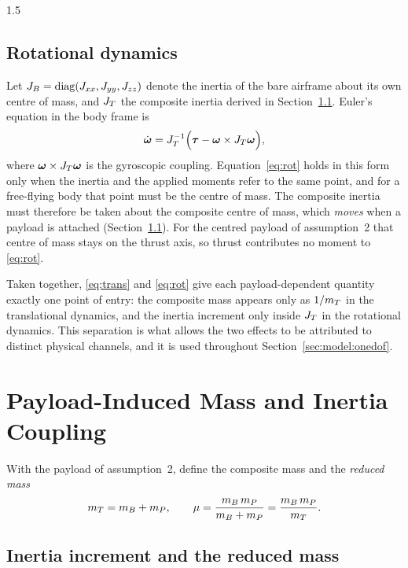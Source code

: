 \begin{spacing}{1.5}
\subsection{Rotational dynamics}\label{sec:model:rot}

Let $J_B = \mathrm{diag}(J_{xx}, J_{yy}, J_{zz})$ denote the inertia of the bare
airframe about its own centre of mass, and $J_T$ the composite inertia derived in
Section~\ref{sec:model:paxis}. Euler's equation in the body frame is
\begin{equation}
\dot{\bm{\omega}} = J_T^{-1}\Bigl( \bm{\tau} - \bm{\omega} \times J_T \bm{\omega} \Bigr),
\label{eq:rot}
\end{equation}
where $\bm{\omega} \times J_T \bm{\omega}$ is the gyroscopic coupling.
Equation~\eqref{eq:rot} holds in this form only when the inertia and the applied
moments refer to the same point, and for a free-flying body that point must be
the centre of mass. The composite inertia must therefore be taken about the
composite centre of mass, which \emph{moves} when a payload is attached
(Section~\ref{sec:model:paxis}). For the centred payload of assumption~2 that
centre of mass stays on the thrust axis, so thrust contributes no moment to
\eqref{eq:rot}.

Taken together, \eqref{eq:trans} and \eqref{eq:rot} give each payload-dependent
quantity exactly one point of entry: the composite mass appears only as $1/m_T$
in the translational dynamics, and the inertia increment only inside $J_T$ in
the rotational dynamics. This separation is what allows the two effects to be
attributed to distinct physical channels, and it is used throughout
Section~\ref{sec:model:onedof}.

\section{Payload-Induced Mass and Inertia Coupling}\label{sec:model:payload}

With the payload of assumption~2, define the composite mass and the
\emph{reduced mass}
\begin{equation}
m_T = m_B + m_P,
\qquad
\mu = \frac{m_B\, m_P}{m_B + m_P} = \frac{m_B\, m_P}{m_T}.
\label{eq:mu}
\end{equation}

\subsection{Inertia increment and the reduced mass}\label{sec:model:paxis}


\end{spacing}
